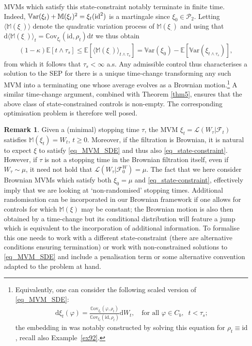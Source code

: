 \documentclass{article}
\theoremstyle{definition}
\newtheorem{remark}[theorem]{\textbf{Remark}}
\numberwithin{equation}{section}
\numberwithin{theorem}{section}
\newcommand{\E}{\mathbb{E}}
\newcommand{\di}{\mathrm{d}}
\newcommand{\Lc}{\mathcal{L}}
\newcommand{\dt}{\mathrm{d}t}
\newcommand{\Fc}{\mathcal{F}}
\newcommand{\Mb}{\mathbb{M}}
\newcommand{\Pc}{\mathcal{P}}
\newcommand{\Cov}{\mathbb{C}\mathrm{ov}}
\newcommand{\Var}{\mathbb{V}\mathrm{ar}}
\newcommand{\id}{{\rm id}}
\begin{document}
	MVMs which satisfy this state-constraint notably terminate in finite time. Indeed, $\Var(\xi_t)+\Mb(\xi_t)^2=\xi_t(\id^2)$ is a martingale since $\xi_0\in\Pc_2$. Letting $\langle\Mb(\xi_\cdot)\rangle$ denote the quadratic variation process of $\Mb(\xi_\cdot)$ and using that $\di\langle\Mb(\xi_\cdot)\rangle_t=\Cov_{\xi_t}(\mathrm{id},\rho_t)\dt$ we thus obtain 
	\begin{align}\label{eq:var_relation}
		(1-\kappa)\E\left[t\wedge\tau_s\right]
		\le 
		\E\left[\langle\Mb(\xi_\cdot)\rangle_{t\wedge\tau_s}\right]
		= \Var(\xi_0)-\E\left[\Var\left(\xi_{t\wedge\tau_s}\right)\right],
	\end{align}
	from which it follows that $\tau_s<\infty$ a.s.
	Any admissible control thus characterises a solution to the SEP for there is a unique time-change transforming any such MVM into a terminating one whose average evolves as a Brownian motion.\footnote{Equivalently, one can consider the following scaled version of \eqref{eq_MVM_SDE}:
  	\begin{align*}%
		\di \xi_t(\varphi)=
		\frac{\Cov_{\xi_t}(\varphi,\rho_t)}{\Cov_{\xi_t}(\mathrm{id},\rho_t)}
		\di W_t,
		\quad
		\textrm{for all $\varphi\in C_b$},
		\;\; t<\tau_s;
	\end{align*}
	the embedding in \cite{eldan2016} was notably constructed by solving this equation for $\rho_t\equiv\mathrm{id}$, recall also Example~\ref{ex92}.}
	A similar time-change argument, combined with Theorem \ref{thm5}, ensures that the above class of state-constrained controls is non-empty. The corresponding optimisation problem is therefore well posed. 
		
	\begin{remark}\label{rem:B_sep}
		Given a (minimal) stopping time $\tau$, the MVM $\xi_t=\Lc(W_\tau|\Fc_t)$ satisfies $\Mb(\xi_t)=W_t$, $t\ge 0$. Moreover, if the filtration is Brownian, it is natural to expect $\xi$ to satisfy \eqref{eq_MVM_SDE} and thus also \eqref{eq_state-constraint}. However, if $\tau$ is not a stopping time in the Brownian filtration itself, even if $W_\tau\sim\mu$, it need not hold that $\Lc(W_\tau|\Fc^W_0)=\mu$.
		The fact that we here consider Brownian MVMs which satisfy both $\xi_0=\mu$ and \eqref{eq_state-constraint}, effectively imply that we are looking at `non-randomised' stopping times.
		Additional randomisation can be incorporated in our Brownian framework if one allows for controls for which $\Mb(\xi)$ may be constant; the Brownian motion is also then obtained by a time-change but its conditional distribution will feature a jump which is equivalent to the incorporation of additional information.
		To formalise this one needs to work with a different state-constraint (there are alternative conditions ensuring termination) or work with non-constrained solutions to \eqref{eq_MVM_SDE} and include a penalisation term or some alternative convention adapted to the problem at hand.
	\end{remark}
	
\end{document}
